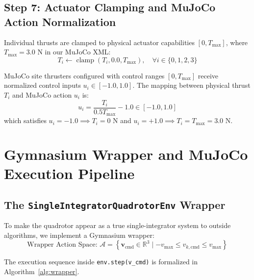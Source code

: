 \documentclass[11pt,a4paper]{article}
\begin{document}
\subsection{Step 7: Actuator Clamping and MuJoCo Action Normalization}
Individual thrusts are clamped to physical actuator capabilities $[0, T_{\max}]$, where $T_{\max} = 3.0\text{ N}$ in our MuJoCo XML:
\begin{equation}
T_i \leftarrow \operatorname{clamp}(T_i, 0.0, T_{\max}), \quad \forall i \in \{0, 1, 2, 3\}
\end{equation}

MuJoCo site thrusters configured with control ranges $[0, T_{\max}]$ receive normalized control inputs $u_i \in [-1.0, 1.0]$. The mapping between physical thrust $T_i$ and MuJoCo action $u_i$ is:
\begin{equation}
u_i = \frac{T_i}{0.5 T_{\max}} - 1.0 \in [-1.0, 1.0]
\label{eq:action_norm}
\end{equation}
which satisfies $u_i = -1.0 \implies T_i = 0\text{ N}$ and $u_i = +1.0 \implies T_i = T_{\max} = 3.0\text{ N}$.

\newpage

\section{Gymnasium Wrapper and MuJoCo Execution Pipeline}

\subsection{The \texttt{SingleIntegratorQuadrotorEnv} Wrapper}
To make the quadrotor appear as a true single-integrator system to outside algorithms, we implement a Gymnasium wrapper:
\begin{equation}
\text{Wrapper Action Space: } \mathcal{A} = \left\{ \mathbf{v}_{\mathrm{cmd}} \in \mathbb{R}^3 \mid -v_{\max} \leq v_{k,\mathrm{cmd}} \leq v_{\max} \right\}
\end{equation}

The execution sequence inside \texttt{env.step(v\_cmd)} is formalized in Algorithm~\ref{alg:wrapper}.
\end{document}
